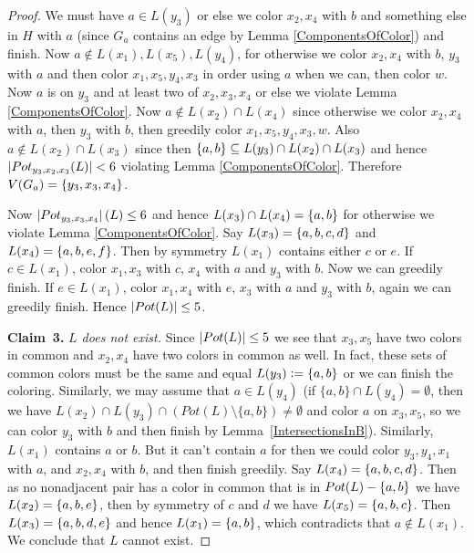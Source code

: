 \begin{proof}
We must have $a \in L(y_3)$ or else we color $x_2, x_4$ with $b$ and something
else in $H$ with $a$ (since $G_a$ contains an edge by Lemma \ref{ComponentsOfColor}) and
finish.  Now $a \not \in L(x_1), L(x_5), L(y_4)$, for
otherwise we color $x_2, x_4$ with $b$, $y_3$ with $a$ and then color $x_1, x_5,
y_4, x_3$ in order using $a$ when we can, then color $w$.  Now $a$ is
on $y_3$ and at least two of $x_2, x_3, x_4$ or else we violate Lemma
\ref{ComponentsOfColor}.  Now $a \not \in L(x_2) \cap L(x_4)$ since otherwise we
color $x_2, x_4$ with $a$, then $y_3$ with $b$, then greedily color $x_1, x_5,
y_4, x_3, w$.  Also $a \not \in L(x_2) \cap L(x_3)$ since then $\left\{ a,b \right\}
\subseteq L(y_3) \cap L(x_2) \cap L(x_3)$ and hence $\left|Pot_{y_3, x_2,
x_3}(L)\right| < 6$ violating Lemma \ref{ComponentsOfColor}.  Therefore $V(G_a) =
\left\{ y_3, x_3, x_4 \right\}$.

Now $\left|Pot_{y_3, x_3, x_4}\right|(L) \leq 6$ and hence
$L(x_3) \cap L(x_4) = \left\{ a,b \right\}$ for otherwise we violate Lemma
\ref{ComponentsOfColor}.  Say $L(x_3) = \left\{ a,b,c,d \right\}$ and $L(x_4) =
\left\{ a,b,e,f \right\}$. Then by symmetry $L(x_1)$ contains either $c$ or $e$.  
If $c \in L(x_1)$, color $x_1, x_3$ with $c$, $x_4$ with $a$ and $y_3$ with $b$.
Now we can greedily finish.  If $e \in L(x_1)$, color $x_1, x_4$ with $e$,
$x_3$ with $a$ and $y_3$ with $b$, again we can greedily finish.  Hence
$\left|Pot(L)\right| \leq 5$.

\textbf{Claim~3.} \textit{$L$ does not exist.}  Since $\left|Pot(L)\right| \leq 5$ we
see that $x_3, x_5$ have two colors in common and $x_2, x_4$ have two colors in
common as well. In fact, these sets of common colors must be the same and equal
$L(y_3) \mathrel{\mathop:}= \left\{ a,b \right\}$ or we can finish the coloring. Similarly, we may
assume that $a \in L(y_4)$ (if $\{a,b\}\cap L(y_4)=\emptyset$, then we have
$L(x_2)\cap L(y_3)\cap (Pot(L)\setminus\{a,b\})\ne \emptyset$ and color $a$ on
$x_3, x_5$, so we can color $y_3$ with $b$ and then finish by
Lemma~\ref{IntersectionsInB}).
Similarly, $L(x_1)$ contains $a$ or $b$.  But it can't
contain $a$ for then we could color $y_3, y_4, x_1$ with $a$, and $x_2, x_4$ with
$b$, and then finish greedily. Say $L(x_4) = \left\{ a,b,c,d \right\}$. Then as no nonadjacent
pair has a color in common that is in $Pot(L) - \left\{ a,b \right\}$ we have $L(x_2) =
\left\{ a,b,e \right\}$, then by symmetry of $c$ and $d$ we have $L(x_5) = \left\{ a,b,c \right\}$.
Then $L(x_3) = \left\{ a,b,d,e \right\}$ and hence $L(x_1) = \left\{ a,b \right\}$, which contradicts
that $a\notin L(x_1)$.
We conclude that $L$ cannot exist.
\end{proof}

